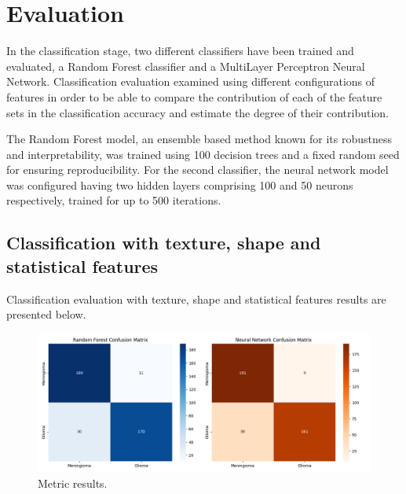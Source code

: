 \documentclass[11pt,a4paper]{article}
\begin{document}
    \section{Evaluation}
		
		\par In the classification stage, two different classifiers have been trained and evaluated, a Random Forest classifier
		and a MultiLayer Perceptron Neural Network. Classification evaluation examined using different configurations of features
		in order to be able to compare the contribution of each of the feature sets in the classification accuracy and estimate
		the degree of their contribution.

		The Random Forest model, an ensemble based method known for its robustness and interpretability, 
		was trained using 100 decision trees and a fixed random seed for ensuring reproducibility. 
		For the second classifier, the neural network model was configured having
		two hidden layers comprising 100 and 50 neurons respectively, trained 
		for up to 500 iterations.

	\subsection{Classification with texture, shape and statistical features}

		Classification evaluation with texture, shape and statistical features results are presented below.
	
		\begin{figure}[h]
			\centering
			\includegraphics[width=1.1\textwidth]{images/classification_pyradiomics.png}
			\caption{Metric results.}
			\label{fig1:}
		\end{figure}		
\end{document}
